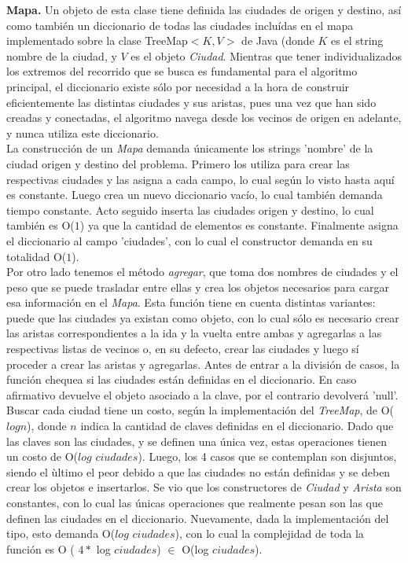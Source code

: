 \indent \textbf{Mapa.} Un objeto de esta clase tiene definida las ciudades de origen y destino, así como también un diccionario de todas las ciudades incluídas en el mapa implementado sobre la clase TreeMap$<K,V>$ de Java (donde $K$ es el string nombre de la ciudad, y $V$ es el objeto \textsl{Ciudad}. Mientras que tener individualizados los extremos del recorrido que se busca es fundamental para el algoritmo principal, el diccionario existe sólo por necesidad a la hora de construir eficientemente las distintas ciudades y sus aristas, pues una vez que han sido creadas y conectadas, el algoritmo navega desde los vecinos de origen en adelante, y nunca utiliza este diccionario.\\
\indent La construcción de un \textsl{Mapa} demanda únicamente los strings 'nombre' de la ciudad origen y destino del problema. Primero los utiliza para crear las respectivas ciudades y las asigna a cada campo, lo cual según lo visto hasta aquí es constante. Luego crea un nuevo diccionario vacío, lo cual también demanda tiempo constante. Acto seguido inserta las ciudades origen y destino, lo cual también es O($1$) ya que la cantidad de elementos es constante. Finalmente asigna el diccionario al campo 'ciudades', con lo cual el constructor demanda en su totalidad O($1$).\\
\indent Por otro lado tenemos el método \textsl{agregar}, que toma dos nombres de ciudades y el peso que se puede trasladar entre ellas y crea los objetos necesarios para cargar esa información en el \textsl{Mapa}. Esta función tiene en cuenta distintas variantes: puede que las ciudades ya existan como objeto, con lo cual sólo es necesario crear las aristas correspondientes a la ida y la vuelta entre ambas y agregarlas a las respectivas listas de vecinos o, en su defecto, crear las ciudades y luego sí proceder a crear las aristas y agregarlas. Antes de entrar a la división de casos, la función chequea si las ciudades están definidas en el diccionario. En caso afirmativo devuelve el objeto asociado a la clave, por el contrario devolverá 'null'. Buscar cada ciudad tiene un costo, según la implementación del \textsl{TreeMap}, de O($log n$), donde $n$ indica la cantidad de claves definidas en el diccionario. Dado que las claves son las ciudades, y se definen una única vez, estas operaciones tienen un costo de O($log$ $ciudades$). Luego, los 4 casos que se contemplan son disjuntos, siendo el ùltimo el peor debido a que las ciudades no están definidas y se deben crear los objetos e insertarlos. Se vio que los constructores de \textsl{Ciudad} y \textsl{Arista} son constantes, con lo cual las únicas operaciones que realmente pesan son las que definen las ciudades en el diccionario. Nuevamente, dada la implementación del tipo, esto demanda O($log$ $ciudades$), con lo cual la complejidad de toda la función es O ( $ 4 *$ log $ciudades$) $\in$ O(log $ciudades$).\\

